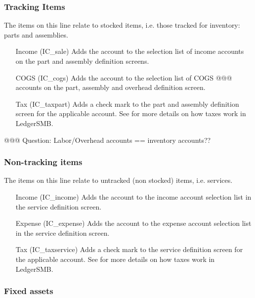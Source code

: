 \subsubsection{Tracking Items}

The items on this line relate to stocked items, i.e. those tracked for inventory: parts and
assemblies.

\begin{enumerate}
\item[Income (IC\_sale)] Adds the account to the selection list of income accounts on the
   part and assembly definition screens.
\item[COGS (IC\_cogs)] Adds the account to the selection list of COGS @@@ accounts on the
   part, assembly and overhead definition screen.
\item[Tax (IC\_taxpart)] Adds a check mark to the part and assembly definition screen
   for the applicable account. See  for more details on how taxes
   work in LedgerSMB.
\end{enumerate}

@@@ Question: Labor/Overhead accounts == inventory accounts??

\subsubsection{Non-tracking items}

The items on this line relate to untracked (non stocked) items, i.e. services.

\begin{enumerate}
\item[Income (IC\_income)] Adds the account to the income account selection list in
   the service definition screen.
\item[Expense (IC\_expense)] Adds the account to the expense account selection list in
   the service definition screen.
\item[Tax (IC\_taxservice)] Adds a check mark to the service definition screen for the
   applicable account. See  for more details on how taxes work in LedgerSMB.
\end{enumerate}

\subsubsection{Fixed assets}

